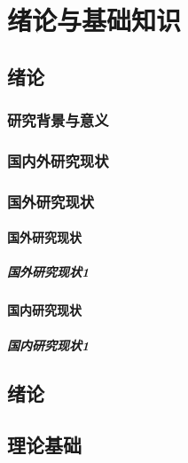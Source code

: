 \documentclass{USTBBook}
\begin{document}
\frontmatter

\tableofcontents

\mainmatter

\part{绪论与基础知识}

\chapter{绪论}
\zhlipsum[1]

\section{研究背景与意义}
\zhlipsum[2]

\zhlipsum[6-7]

\section{国内外研究现状}
\zhlipsum[3-5]

\section{国外研究现状}
\subsection{国外研究现状}
\subsubsection{国外研究现状1}
\zhlipsum[4]

\subsection{国内研究现状}
\subsubsection{国内研究现状1}
\zhlipsum[5]

\chapter{绪论}
\zhlipsum[1]

\chapter{理论基础}
\zhlipsum[6]
\end{document}
